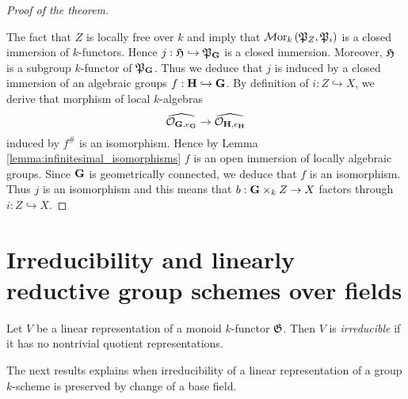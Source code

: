 \begin{proof}[Proof of the theorem]
\begin{center}
\end{center}
The fact that $Z$ is locally free over $k$ and {\cite[Theorem 7.2]{kfunctors}} imply that $\mathcal{M}\mathrm{or}_k\left({\mathfrak P}_{Z},{\mathfrak P}_{i}\right)$ is a closed immersion of $k$-functors. Hence $j:{\mathfrak H} \hookrightarrow {\mathfrak P}_{\mathbf{G}}$ is a closed immersion. Moreover, ${\mathfrak H}$ is a subgroup $k$-functor of ${\mathfrak P}_{\mathbf{G}}$. Thus we deduce that $j$ is induced by a closed immersion of an algebraic groups $f:\mathbf{H} \hookrightarrow \mathbf{G}$. By definition of $i:Z\hookrightarrow X$, we derive that morphism of local $k$-algebras
$$\widehat{{\mathcal O}_{\mathbf{G},e_{\mathbf{G}}}} \rightarrow  \widehat{{\mathcal O}_{\mathbf{H},e_{\mathbf{H}}}}$$
induced by $f^{\#}$ is an isomorphism. Hence by Lemma \ref{lemma:infinitesimal_isomorphisms} $f$ is an open immersion of locally algebraic groups. Since $\mathbf{G}$ is geometrically connected, we deduce that $f$ is an isomorphism. Thus $j$ is an isomorphism and this means that $b:\mathbf{G}\times_k Z\rightarrow X$ factors through $i:Z\hookrightarrow X$.
\end{proof}

\section{Irreducibility and linearly reductive group schemes over fields}

\begin{definition}
Let $V$ be a linear representation of a monoid $k$-functor ${\mathfrak G}$. Then $V$ is \textit{irreducible} if it has no nontrivial quotient representations.
\end{definition}
\noindent
The next results explains when irreducibility of a linear representation of a group $k$-scheme is preserved by change of a base field.


